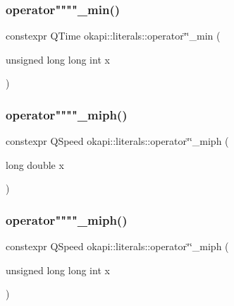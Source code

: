 \mbox{\label{namespaceokapi_1_1literals_ae9718c12341692e929cde7bedcc55e4a}} 
\subsubsection{\texorpdfstring{operator""""\_min()}{operator""\_min()}\hspace{0.1cm}{\footnotesize\ttfamily [2/2]}}
{\footnotesize\ttfamily constexpr Q\+Time okapi\+::literals\+::operator\char`\"{}\char`\"{}\+\_\+min (\begin{DoxyParamCaption}\item[{unsigned long long int}]{x }\end{DoxyParamCaption})}

\mbox{\label{namespaceokapi_1_1literals_a8cc3fe94052d38905e4797cc84cff761}} 
\subsubsection{\texorpdfstring{operator""""\_miph()}{operator""\_miph()}\hspace{0.1cm}{\footnotesize\ttfamily [1/2]}}
{\footnotesize\ttfamily constexpr Q\+Speed okapi\+::literals\+::operator\char`\"{}\char`\"{}\+\_\+miph (\begin{DoxyParamCaption}\item[{long double}]{x }\end{DoxyParamCaption})}

\mbox{\label{namespaceokapi_1_1literals_a6f253f324521217cc196304f2e85c0c0}} 
\subsubsection{\texorpdfstring{operator""""\_miph()}{operator""\_miph()}\hspace{0.1cm}{\footnotesize\ttfamily [2/2]}}
{\footnotesize\ttfamily constexpr Q\+Speed okapi\+::literals\+::operator\char`\"{}\char`\"{}\+\_\+miph (\begin{DoxyParamCaption}\item[{unsigned long long int}]{x }\end{DoxyParamCaption})}

